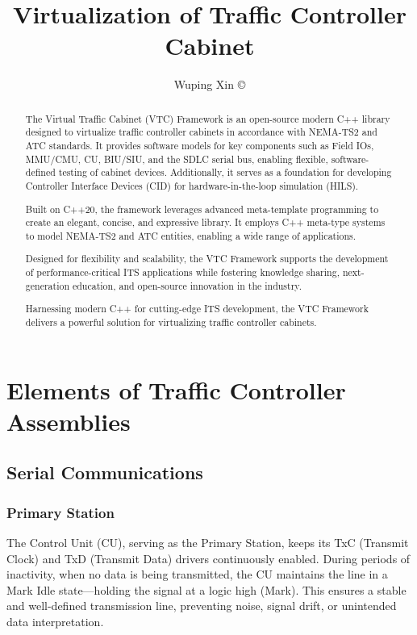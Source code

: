 \documentclass[]{article}
\title{Virtualization of Traffic Controller Cabinet}
\author{Wuping Xin ©}
\begin{document}
\maketitle

\begin{abstract}
The Virtual Traffic Cabinet (VTC) Framework is an open-source modern C++ library designed to virtualize traffic controller cabinets in accordance with NEMA-TS2 and ATC standards. It provides software models for key components such as Field IOs, MMU/CMU, CU, BIU/SIU, and the SDLC serial bus, enabling flexible, software-defined testing of cabinet devices. Additionally, it serves as a foundation for developing Controller Interface Devices (CID) for hardware-in-the-loop simulation (HILS).

Built on C++20, the framework leverages advanced meta-template programming to create an elegant, concise, and expressive library. It employs C++ meta-type systems to model NEMA-TS2 and ATC entities, enabling a wide range of applications.

Designed for flexibility and scalability, the VTC Framework supports the development of performance-critical ITS applications while fostering knowledge sharing, next-generation education, and open-source innovation in the industry.

Harnessing modern C++ for cutting-edge ITS development, the VTC Framework delivers a powerful solution for virtualizing traffic controller cabinets.
  
\end{abstract}
\clearpage

\tableofcontents
\clearpage

\section{Elements of Traffic Controller Assemblies}

\subsection {Serial Communications}

\subsubsection {Primary Station}
The Control Unit (CU), serving as the Primary Station, keeps its TxC (Transmit Clock) and TxD (Transmit Data) drivers continuously enabled. During periods of inactivity, when no data is being transmitted, the CU maintains the line in a Mark Idle state—holding the signal at a logic high (Mark). This ensures a stable and well-defined transmission line, preventing noise, signal drift, or unintended data interpretation.
\end{document}
